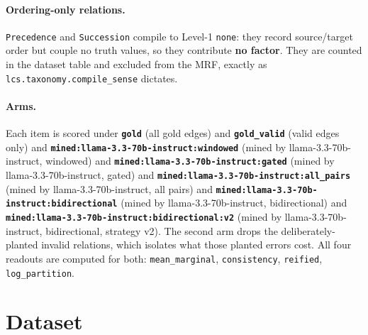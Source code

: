\documentclass[11pt]{article}
\begin{document}
\paragraph{Ordering-only relations.} \texttt{Precedence} and \texttt{Succession} compile to Level-1 \texttt{none}: they record source/target order but couple no truth values, so they contribute \textbf{no factor}. They are counted in the dataset table and excluded from the MRF, exactly as \texttt{lcs.taxonomy.compile\_sense} dictates.

\paragraph{Arms.} Each item is scored under \textbf{\texttt{gold}} (all gold edges) and \textbf{\texttt{gold\_valid}} (valid edges only) and \textbf{\texttt{mined:llama-3.3-70b-instruct:windowed}} (mined by llama-3.3-70b-instruct, windowed) and \textbf{\texttt{mined:llama-3.3-70b-instruct:gated}} (mined by llama-3.3-70b-instruct, gated) and \textbf{\texttt{mined:llama-3.3-70b-instruct:all\_pairs}} (mined by llama-3.3-70b-instruct, all pairs) and \textbf{\texttt{mined:llama-3.3-70b-instruct:bidirectional}} (mined by llama-3.3-70b-instruct, bidirectional) and \textbf{\texttt{mined:llama-3.3-70b-instruct:bidirectional:v2}} (mined by llama-3.3-70b-instruct, bidirectional, strategy v2). The second arm drops the deliberately-planted invalid relations, which isolates what those planted errors cost. All four readouts are computed for both: \texttt{mean\_marginal}, \texttt{consistency}, \texttt{reified}, \texttt{log\_partition}.

\section{Dataset}
\end{document}
